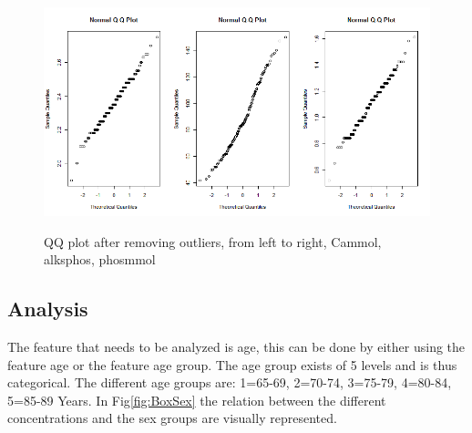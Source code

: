 \documentclass{article}
\begin{document}
	\begin{figure}
		\centering
		{\includegraphics[scale=0.3]{../results/dat2_qq.png}}
		\caption{QQ plot after removing outliers, from left to right, Cammol, alksphos, phosmmol}
		\label{fig:qq2}
	\end{figure}
	
    \subsection{Analysis}
      The feature that needs to be analyzed is age, this can be done by either using the feature age or the feature age group.
      The age group exists of 5 levels and is thus categorical.
      The different age groups are: 1=65-69, 2=70-74, 3=75-79, 4=80-84, 5=85-89 Years.
      In Fig\ref{fig:BoxSex} the relation between the different concentrations and the sex groups are visually represented.
\end{document}
